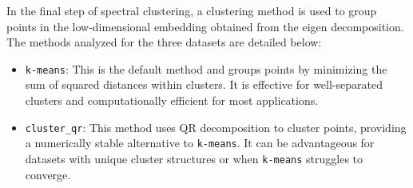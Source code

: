 In the final step of spectral clustering, a clustering method is used to group points in the low-dimensional embedding
 obtained from the eigen decomposition. The methods analyzed for the three datasets are detailed below:
 \begin{itemize}
    \item \texttt{k-means}: This is the default method and groups points by minimizing the sum of squared distances within clusters. It is effective for well-separated clusters and computationally efficient for most applications.
    \item \texttt{cluster\_qr}: This method uses QR decomposition to cluster points, providing a numerically stable alternative to \texttt{k-means}. It can be advantageous for datasets with unique cluster structures or when \texttt{k-means} struggles to converge.
\end{itemize}
